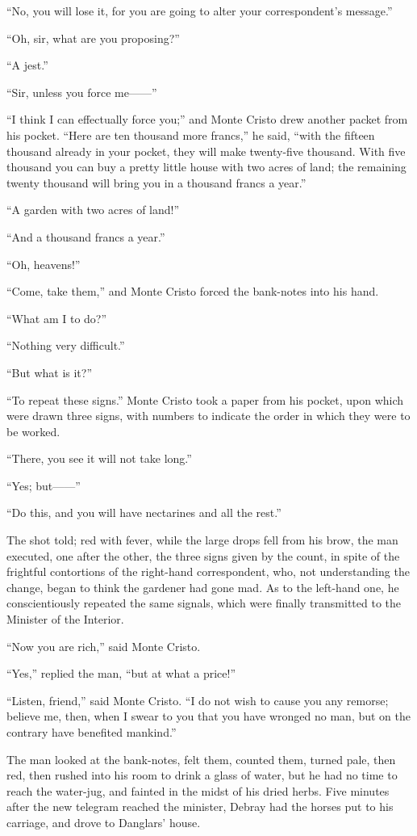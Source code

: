 “No, you will lose it, for you are going to alter your correspondent’s
message.”

“Oh, sir, what are you proposing?”

“A jest.”

“Sir, unless you force me——”

“I think I can effectually force you;” and Monte Cristo drew another
packet from his pocket. “Here are ten thousand more francs,” he said,
“with the fifteen thousand already in your pocket, they will make
twenty-five thousand. With five thousand you can buy a pretty little
house with two acres of land; the remaining twenty thousand will bring
you in a thousand francs a year.”

“A garden with two acres of land!”

“And a thousand francs a year.”

“Oh, heavens!”

“Come, take them,” and Monte Cristo forced the bank-notes into his
hand.

“What am I to do?”

“Nothing very difficult.”

“But what is it?”

“To repeat these signs.” Monte Cristo took a paper from his pocket,
upon which were drawn three signs, with numbers to indicate the order
in which they were to be worked.

“There, you see it will not take long.”

“Yes; but——”

“Do this, and you will have nectarines and all the rest.”

The shot told; red with fever, while the large drops fell from his
brow, the man executed, one after the other, the three signs given by
the count, in spite of the frightful contortions of the right-hand
correspondent, who, not understanding the change, began to think the
gardener had gone mad. As to the left-hand one, he conscientiously
repeated the same signals, which were finally transmitted to the
Minister of the Interior.

“Now you are rich,” said Monte Cristo.

“Yes,” replied the man, “but at what a price!”

“Listen, friend,” said Monte Cristo. “I do not wish to cause you any
remorse; believe me, then, when I swear to you that you have wronged no
man, but on the contrary have benefited mankind.”

The man looked at the bank-notes, felt them, counted them, turned pale,
then red, then rushed into his room to drink a glass of water, but he
had no time to reach the water-jug, and fainted in the midst of his
dried herbs. Five minutes after the new telegram reached the minister,
Debray had the horses put to his carriage, and drove to Danglars’
house.

